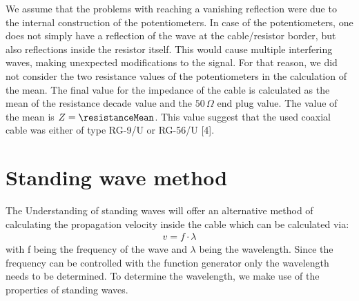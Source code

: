 \documentclass[a4paper,10pt,twocolumn]{article}
\begin{document}
    We assume that the problems with reaching a vanishing reflection were due to the internal construction of the potentiometers.
    In case of the potentiometers, one does not simply have a reflection of the wave at the cable/resistor border, but also reflections inside the resistor itself.
    This would cause multiple interfering waves, making unexpected modifications to the signal.
    For that reason, we did not consider the two resistance values of the potentiometers in the calculation of the mean.
    The final value for the impedance of the cable is calculated as the mean of the resistance decade value and the $50\,\Omega$ end plug value.
    The value of the mean is $Z = \resistanceMean$.
    This value suggest that the used coaxial cable was either of type RG-9/U or RG-56/U [4].
    
    \section{Standing wave method}
    \label{subsec:standingWaveMethod}
    The Understanding of standing waves will offer an alternative method of calculating the propagation velocity inside the cable which can be calculated via:
    \begin{align}
        \label{eq:velocityStanding}
        v = f\cdot\lambda
        \end{align}
    with f being the frequency of the wave and $\lambda$ being the wavelength.
    Since the frequency can be controlled with the function generator only the wavelength needs to be determined.
    To determine the wavelength, we make use of the properties of standing waves. 
    
\end{document}
